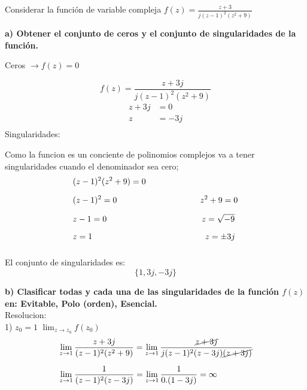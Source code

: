 \documentclass[12pt]{report}
\begin{document}
\chapter{}%

Considerar la función de variable compleja $f(z) =\frac{z + 3}{j(z - 1)^2(z^2 + 9)}$

\textbf{a) Obtener el conjunto de ceros y el conjunto de singularidades de la función.}

Ceros $\rightarrow f(z)=0$

$$f(z)=\frac{z + 3j}{j(z - 1)^2(z^2 + 9)}$$
\begin{align*}
z+3j&=0\\[6pt]
z&=-3j\\[6pt]
\end{align*}
Singularidades:

Como la funcion es un conciente de polinomios complejos va a tener singularidades cuando el denominador sea cero;\\

\begin{align*}
&(z-1)^2(z^2+9)=0\\[6pt]
&(z-1)^2=0 \hspace{3.5cm}    z^2+9=0\\[6pt]
&z-1=0     \hspace{4cm}   z=\sqrt{-9}\\[6pt]
&z=1       \hspace{4.75cm}  z=\pm3j\\[6pt]
\end{align*}

El conjunto de singularidades es: $$\{1,3j,-3j\}$$

\textbf{b) Clasificar todas y cada una de las singularidades de la función $f(z)$ en: Evitable, Polo (orden), Esencial.}\\[6pt]
Resolucion:\\

1) $z_0=1$ \hspace{3cm} $\lim_{z \to z_0}f(z_0)$\\[10pt]

\begin{align*}
&\lim_{z \to 1}\frac{z+3j}{(z - 1)^2(z^2 + 9)}=\lim_{z \to 1}\frac{\cancel{z+3j}}{j(z - 1)^2(z-3j)\cancel{(z+3j)}}\\[6pt]
&\lim_{z \to 1}\frac{1}{(z - 1)^2(z-3j)}=\lim_{z \to 1}\frac{1}{0.(1-3j)}=\infty\\[6pt]
\end{align*}
\end{document}
